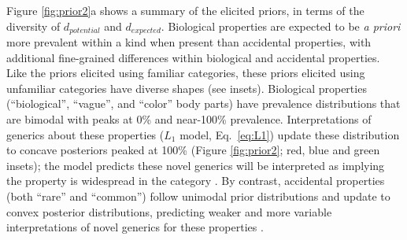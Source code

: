 \documentclass[12pt,letterpaper]{article}
\begin{document}
Figure \ref{fig:prior2}a shows a summary of the elicited priors, in terms of the diversity of $d_{potential}$ and $d_{expected}$.
Biological properties are expected to be \emph{a priori} more prevalent within a kind when present than accidental properties, with additional fine-grained differences within biological and accidental properties.
Like the priors elicited using familiar categories, these priors elicited using unfamiliar categories have diverse shapes (see insets). 
Biological properties (``biological'', ``vague'', and ``color'' body parts) have prevalence distributions that are bimodal with peaks at 0\% and near-100\% prevalence. 
Interpretations of generics about these properties ($L_1$ model, Eq.~\ref{eq:L1}) update these distribution to concave posteriors peaked at 100\% (Figure \ref{fig:prior2}; red, blue and green insets); the model predicts these novel generics will be interpreted as implying the property is widespread in the category \cite{Gelman2002}.
By contrast, accidental properties (both ``rare'' and ``common'') follow unimodal prior distributions and update to convex posterior distributions, predicting weaker and more variable interpretations of novel generics for these properties \cite{Cimpian2010c}. 
\end{document}
